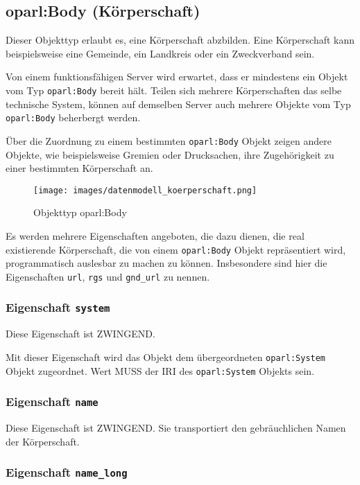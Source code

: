 \documentclass[,a4paper]{article}
\makeatletter
\def\maxwidth{\ifdim\Gin@nat@width>\linewidth\linewidth
\else\Gin@nat@width\fi}
\let\Oldincludegraphics\includegraphics
\renewcommand{\includegraphics}[1]{\Oldincludegraphics[width=\maxwidth]{#1}}
\makeatother
\begin{document}
\subsection{oparl:Body (Körperschaft)}

Dieser Objekttyp erlaubt es, eine Körperschaft abzbilden. Eine
Körperschaft kann beispielsweise eine Gemeinde, ein Landkreis oder ein
Zweckverband sein.

Von einem funktionsfähigen Server wird erwartet, dass er mindestens ein
Objekt vom Typ \texttt{oparl:Body} bereit hält. Teilen sich mehrere
Körperschaften das selbe technische System, können auf demselben Server
auch mehrere Objekte vom Typ \texttt{oparl:Body} beherbergt werden.

Über die Zuordnung zu einem bestimmten \texttt{oparl:Body} Objekt zeigen
andere Objekte, wie beispielsweise Gremien oder Drucksachen, ihre
Zugehörigkeit zu einer bestimmten Körperschaft an.

\begin{figure}[htbp]
\centering
\texttt{[image: images/datenmodell\_koerperschaft.png]}
\caption{Objekttyp oparl:Body}
\end{figure}

Es werden mehrere Eigenschaften angeboten, die dazu dienen, die real
existierende Körperschaft, die von einem \texttt{oparl:Body} Objekt
repräsentiert wird, programmatisch auslesbar zu machen zu können.
Insbesondere sind hier die Eigenschaften \texttt{url}, \texttt{rgs} und
\texttt{gnd\_url} zu nennen.

\subsubsection{Eigenschaft \texttt{system}}

Diese Eigenschaft ist ZWINGEND.

Mit dieser Eigenschaft wird das Objekt dem übergeordneten
\texttt{oparl:System} Objekt zugeordnet. Wert MUSS der IRI des
\texttt{oparl:System} Objekts sein.

\subsubsection{Eigenschaft \texttt{name}}

Diese Eigenschaft ist ZWINGEND. Sie transportiert den gebräuchlichen
Namen der Körperschaft.

\subsubsection{Eigenschaft \texttt{name\_long}}
\end{document}
